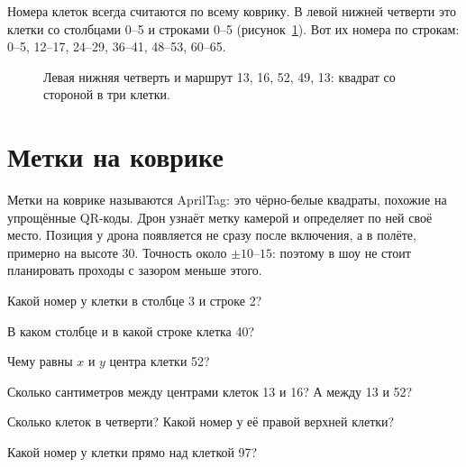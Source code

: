 Номера клеток всегда считаются по всему коврику. В левой нижней четверти это клетки со столбцами 0–5 и строками 0–5 (рисунок~\ref{fig:quarter}). Вот их номера по строкам: 0–5, 12–17, 24–29, 36–41, 48–53, 60–65.

\begin{figure}[tbp]
  \centering
  
  \caption{Левая нижняя четверть и маршрут 13, 16, 52, 49, 13: квадрат со стороной в три клетки.}\label{fig:quarter}
\end{figure}

\section{Метки на коврике}

Метки на коврике называются AprilTag: это чёрно-белые квадраты, похожие на упрощённые QR-коды. Дрон узнаёт метку камерой и определяет по ней своё место. Позиция у дрона появляется не сразу после включения, а в полёте, примерно на высоте 30\cm. Точность около $\pm 10$–$15$\cm: поэтому в шоу не стоит планировать проходы с зазором меньше этого.

\begin{probuy}
  \item Какой номер у клетки в столбце 3 и строке 2?
  \item В каком столбце и в какой строке клетка 40?
  \item Чему равны $x$ и $y$ центра клетки 52?
  \item Сколько сантиметров между центрами клеток 13 и 16? А между 13 и 52?
  \item Сколько клеток в четверти? Какой номер у её правой верхней клетки?
  \item Какой номер у клетки прямо над клеткой 97?
\end{probuy}
